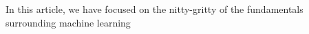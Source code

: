 In this article, we have focused on the nitty-gritty of the fundamentals surrounding machine learning 